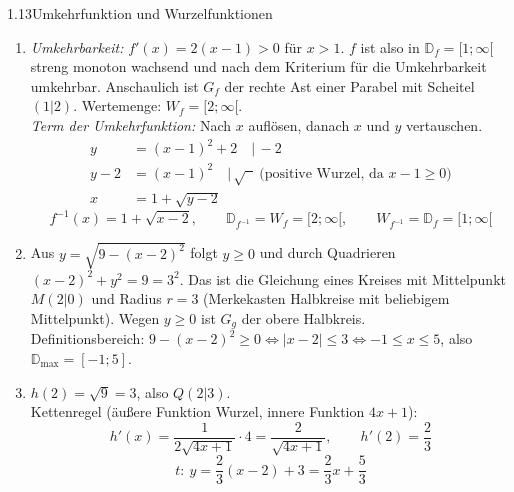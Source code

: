 \begin{loesung}{1.13}{Umkehrfunktion und Wurzelfunktionen}
\begin{enumerate}[label=\alph*)]
  \item \textit{Umkehrbarkeit:} $f'(x) = 2(x-1) > 0$ für $x>1$. $f$ ist also in $\mathds{D}_f = [1;\infty[$ streng monoton wachsend und nach dem Kriterium für die Umkehrbarkeit umkehrbar. Anschaulich ist $G_f$ der rechte Ast einer Parabel mit Scheitel $(1|2)$. Wertemenge: $W_f = [2;\infty[$.\\
  \textit{Term der Umkehrfunktion:} Nach $x$ auflösen, danach $x$ und $y$ vertauschen.
  \begin{align*}
    y &= (x-1)^2+2 \quad\big|\,-2\\
    y-2 &= (x-1)^2 \quad\big|\,\sqrt{\phantom{x}}\ \text{(positive Wurzel, da $x-1\geq 0$)}\\
    x &= 1+\sqrt{y-2}
  \end{align*}
  \[f^{-1}(x) = 1+\sqrt{x-2},\qquad \mathds{D}_{f^{-1}} = W_f = [2;\infty[,\qquad W_{f^{-1}} = \mathds{D}_f = [1;\infty[\]
  \item Aus $y=\sqrt{9-(x-2)^2}$ folgt $y\geq 0$ und durch Quadrieren $(x-2)^2+y^2 = 9 = 3^2$. Das ist die Gleichung eines Kreises mit Mittelpunkt $M(2|0)$ und Radius $r=3$ (Merkekasten \glqq Halbkreise mit beliebigem Mittelpunkt\grqq). Wegen $y\geq 0$ ist $G_g$ der obere Halbkreis.\\
  Definitionsbereich: $9-(x-2)^2\geq 0 \Longleftrightarrow |x-2|\leq 3 \Longleftrightarrow -1\leq x\leq 5$, also $\mathds{D}_{\text{max}} = [-1;5]$.
  \item $h(2) = \sqrt{9} = 3$, also $Q(2|3)$.\\
  Kettenregel (äußere Funktion Wurzel, innere Funktion $4x+1$):
  \[h'(x) = \dfrac{1}{2\sqrt{4x+1}}\cdot 4 = \dfrac{2}{\sqrt{4x+1}},\qquad h'(2) = \dfrac{2}{3}\]
  \[t:\ y = \dfrac{2}{3}(x-2)+3 = \dfrac{2}{3}x+\dfrac{5}{3}\]
\end{enumerate}
\end{loesung}


